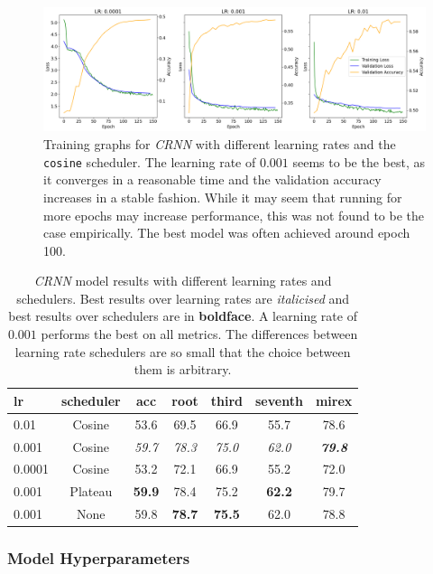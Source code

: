 \begin{figure}[H]
    \centering
    \includegraphics[width=1.0\textwidth]{figures/lr_search_cosine.png}
    \caption{Training graphs for \emph{CRNN} with different learning rates and the \texttt{cosine} scheduler. The learning rate of $0.001$ seems to be the best, as it converges in a reasonable time and the validation accuracy increases in a stable fashion. While it may seem that running for more epochs may increase performance, this was not found to be the case empirically. The best model was often achieved around epoch 100.}\label{fig:lr_search_cosine}
\end{figure}

\begin{table}[H]
    \centering
    \begin{tabular}{lcccccc}
        \toprule
        lr & scheduler & acc & root & third & seventh & mirex \\
        \midrule
        0.01 & Cosine &  53.6 & 69.5 & 66.9 & 55.7 & 78.6 \\
        0.001 & Cosine & \emph{59.7} & \emph{78.3} & \emph{75.0} & \emph{62.0} & \emph{\textbf{79.8}} \\
        0.0001 & Cosine & 53.2 & 72.1 & 66.9 & 55.2 & 72.0 \\
        \midrule
        0.001 & Plateau & \textbf{59.9} & 78.4 & 75.2 & \textbf{62.2} & 79.7 \\
        0.001 & None & 59.8 & \textbf{78.7} &\textbf{75.5} & 62.0 & 78.8 \\
        \bottomrule
    \end{tabular}
    \caption{\emph{CRNN} model results with different learning rates and schedulers. Best results over learning rates are \emph{italicised} and best results over schedulers are in \textbf{boldface}. A learning rate of $0.001$ performs the best on all metrics. The differences between learning rate schedulers are so small that the choice between them is arbitrary. }\label{tab:crnn_lr}
\end{table}

\subsubsection{Model Hyperparameters}\label{sec:model_hyperparameters}

